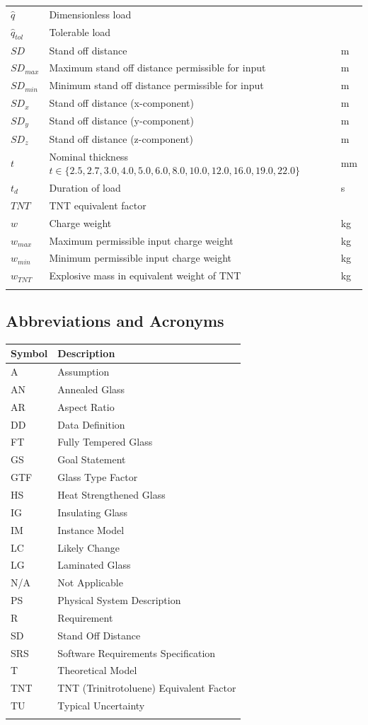 \documentclass[12pt]{article}
\begin{document}
\begin{longtabu}{l X[l] l}
\\
$\hat{q}$ & Dimensionless load & 
\\
${\hat{q}_{tol}}$ & Tolerable load & 
\\
$SD$ & Stand off distance & m
\\
${SD_{max}}$ & Maximum stand off distance permissible for input & m
\\
${SD_{min}}$ & Minimum stand off distance permissible for input & m
\\
${SD_{x}}$ & Stand off distance (x-component) & m
\\
${SD_{y}}$ & Stand off distance (y-component) & m
\\
${SD_{z}}$ & Stand off distance (z-component) & m
\\
$t$ & Nominal thickness $t\in{}\{2.5, 2.7, 3.0, 4.0, 5.0, 6.0, 8.0, 10.0, 12.0, 16.0, 19.0, 22.0\}$ & mm
\\
${t_{d}}$ & Duration of load & s
\\
$TNT$ & TNT equivalent factor & 
\\
$w$ & Charge weight & kg
\\
${w_{max}}$ & Maximum permissible input charge weight & kg
\\
${w_{min}}$ & Minimum permissible input charge weight & kg
\\
${w_{TNT}}$ & Explosive mass in equivalent weight of TNT & kg
\\
\bottomrule
\label{Table:TablofSymb}
\end{longtabu}
\subsection{Abbreviations and Acronyms}
\label{Sec:AbbrandAcro}
\begin{longtable*}{l l}
\toprule
Symbol & Description
\\
\midrule
A & Assumption
\\
AN & Annealed Glass
\\
AR & Aspect Ratio
\\
DD & Data Definition
\\
FT & Fully Tempered Glass
\\
GS & Goal Statement
\\
GTF & Glass Type Factor
\\
HS & Heat Strengthened Glass
\\
IG & Insulating Glass
\\
IM & Instance Model
\\
LC & Likely Change
\\
LG & Laminated Glass
\\
N/A & Not Applicable
\\
PS & Physical System Description
\\
R & Requirement
\\
SD & Stand Off Distance
\\
SRS & Software Requirements Specification
\\
T & Theoretical Model
\\
TNT & TNT (Trinitrotoluene) Equivalent Factor
\\
TU & Typical Uncertainty
\\
\bottomrule
\label{Table:AbbrandAcro}
\end{longtable*}
\end{document}
